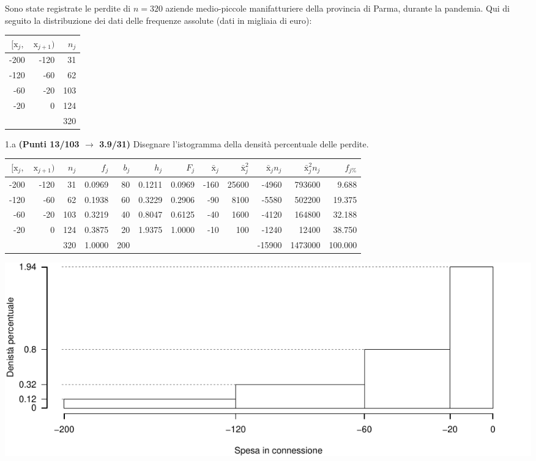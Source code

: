 \documentclass[
  11pt,
]{book}
\theoremstyle{mytheoremstyle}
\theoremstyle{mydefstyle}
\newenvironment{sol}
  {
  \begin{tcolorbox}[enhanced,breakable,arc=0.1mm,boxrule=1pt,colback=white,colframe=iblue,
  title=\bf \fontfamily{lmss}\selectfont \hspace{.5 cm} Soluzione,drop fuzzy shadow]

}{
\end{tcolorbox}
  }
\begin{document}
Sono state registrate le perdite di \(n=320\) aziende medio-piccole manifatturiere della provincia di Parma, durante la pandemia. Qui di seguito la distribuzione dei dati delle frequenze assolute (dati in migliaia di euro):

\begin{table}[H]
\centering
\begin{tabular}{rrr}
\toprule
$[\text{x}_j,$ & $\text{x}_{j+1})$ & $n_j$\\
\midrule
-200 & -120 & 31\\
-120 & -60 & 62\\
-60 & -20 & 103\\
-20 & 0 & 124\\
 &  & 320\\
\bottomrule
\end{tabular}
\end{table}

1.a \textbf{(Punti 13/103 \(\rightarrow\) 3.9/31)} Disegnare l'istogramma della densità percentuale delle perdite.

\begin{sol}

\begin{table}[H]
\centering
\begin{tabular}{rrrrrrrrrrrr}
\toprule
$[\text{x}_j,$ & $\text{x}_{j+1})$ & $n_j$ & $f_j$ & $b_j$ & $h_j$ & $F_j$ & $\bar{\text{x}}_j$ & $\bar{\text{x}}_j^2$ & $\bar{\text{x}}_jn_j$ & $\bar{\text{x}}_j^2 n_j$ & $f_{j\%}$\\
\midrule
-200 & -120 & 31 & 0.0969 & 80 & 0.1211 & 0.0969 & -160 & 25600 & -4960 & 793600 & 9.688\\
-120 & -60 & 62 & 0.1938 & 60 & 0.3229 & 0.2906 & -90 & 8100 & -5580 & 502200 & 19.375\\
-60 & -20 & 103 & 0.3219 & 40 & 0.8047 & 0.6125 & -40 & 1600 & -4120 & 164800 & 32.188\\
-20 & 0 & 124 & 0.3875 & 20 & 1.9375 & 1.0000 & -10 & 100 & -1240 & 12400 & 38.750\\
 &  & 320 & 1.0000 & 200 &  &  &  &  & -15900 & 1473000 & 100.000\\
\bottomrule
\end{tabular}
\end{table}

\begin{center}\includegraphics{Esami_passati_con_soluzioni_files/figure-latex/unnamed-chunk-60-1} \end{center}

\end{sol}
\end{document}
